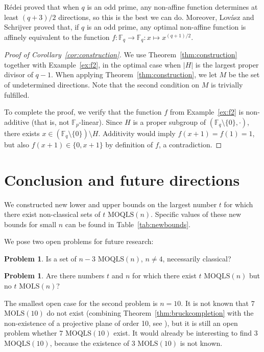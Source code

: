 \documentclass[a4paper]{article}
\theoremstyle{definition}
\newtheorem{problem}[theorem]{Problem}
\newcommand{\FF}{\mathbb F}
\newcommand{\MOLS}[1]{\(\mathrm{MOLS}(#1)\)}
\newcommand{\MOQLS}[1]{\(\mathrm{MOQLS}(#1)\)}
\begin{document}
Rédei \cite{Redei} proved that when \(q\) is an odd prime, any non-affine function determines at least $(q+3)/2$ directions, so this is the best we can do. Moreover, Lov\'asz and Schrijver \cite{LS1981} proved that, if \(q\) is an odd prime, any optimal non-affine function is affinely equivalent to the function \(f:\FF_q\to\FF_q:x\mapsto x^{(q+1)/2}\).

\begin{proof}[Proof of Corollary~\ref{cor:construction}]
    We use Theorem~\ref{thm:construction} together with Example~\ref{ex:f2}, in the optimal case when \(|H|\) is the largest proper divisor of \(q-1\).
    When applying Theorem~\ref{thm:construction}, we let \(M\) be the set of undetermined directions. Note that the second condition on \(M\) is trivially fulfilled.

    To complete the proof, we verify that the function \(f\) from Example~\ref{ex:f2} is non-additive (that is, not \(\FF_p\)-linear). 
    Since \(H\) is a proper subgroup of \((\FF_q\setminus\{0\},\cdot)\), there exists \(x\in\left(\FF_q\setminus\{0\}\right)\setminus H\). Additivity would imply \(f(x+1)=f(1)=1\), but also \(f(x+1)\in\{0,x+1\}\) by definition of \(f\), a contradiction.
\end{proof}

\section{Conclusion and future directions}

We constructed new lower and upper bounds on the largest number \(t\) for which there exist non-classical sets of \(t\) \MOQLS{n}. Specific values of these new bounds for small \(n\) can be found in Table~\ref{tab:newbounds}.

We pose two open problems for future research:

\begin{problem}
    Is a set of \(n-3\) \MOQLS{n}, \(n\neq4\), necessarily classical?
\end{problem}

\begin{problem}
    Are there numbers \(t\) and \(n\) for which there exist \(t\) \MOQLS{n} but no \(t\) \MOLS{n}?
\end{problem}

The smallest open case for the second problem is \(n=10\). It is not known that \(7\) \MOLS{10} do not exist (combining Theorem~\ref{thm:bruckcompletion} with the non-existence of a projective plane of order 10, see \cite{BruckRyser}), but it is still an open problem whether \(7\) \MOQLS{10} exist. It would already be interesting to find \(3\) \MOQLS{10}, because the existence of \(3\) \MOLS{10} is not known.
\end{document}
